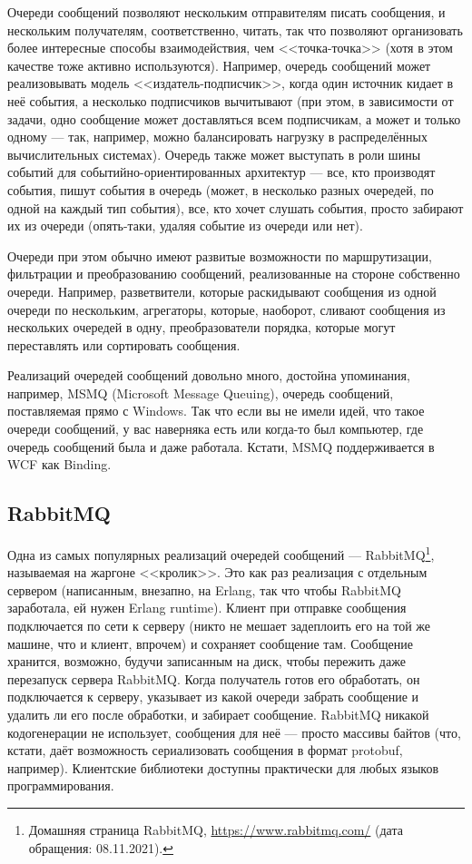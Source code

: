 \documentclass[a5paper]{article}
\begin{document}
Очереди сообщений позволяют нескольким отправителям писать сообщения, и нескольким получателям, соответственно, читать, так что позволяют организовать более интересные способы взаимодействия, чем <<точка-точка>> (хотя в этом качестве тоже активно используются). Например, очередь сообщений может реализовывать модель <<издатель-подписчик>>, когда один источник кидает в неё события, а несколько подписчиков вычитывают (при этом, в зависимости от задачи, одно сообщение может доставляться всем подписчикам, а может и только одному --- так, например, можно балансировать нагрузку в распределённых вычислительных системах). Очередь также может выступать в роли шины событий для событийно-ориентированных архитектур --- все, кто производят события, пишут события в очередь (может, в несколько разных очередей, по одной на каждый тип события), все, кто хочет слушать события, просто забирают их из очереди (опять-таки, удаляя событие из очереди или нет).

Очереди при этом обычно имеют развитые возможности по маршрутизации, фильтрации и преобразованию сообщений, реализованные на стороне собственно очереди. Например, разветвители, которые раскидывают сообщения из одной очереди по нескольким, агрегаторы, которые, наоборот, сливают сообщения из нескольких очередей в одну, преобразователи порядка, которые могут переставлять или сортировать сообщения.

Реализаций очередей сообщений довольно много, достойна упоминания, например, MSMQ (Microsoft Message Queuing), очередь сообщений, поставляемая прямо с Windows. Так что если вы не имели идей, что такое очереди сообщений, у вас наверняка есть или когда-то был компьютер, где очередь сообщений была и даже работала. Кстати, MSMQ поддерживается в WCF как Binding.

\subsection{RabbitMQ}

Одна из самых популярных реализаций очередей сообщений --- RabbitMQ\footnote{Домашняя страница RabbitMQ, \url{https://www.rabbitmq.com/} (дата обращения: 08.11.2021).}, называемая на жаргоне <<кролик>>. Это как раз реализация с отдельным сервером (написанным, внезапно, на Erlang, так что чтобы RabbitMQ заработала, ей нужен Erlang runtime). Клиент при отправке сообщения подключается по сети к серверу (никто не мешает задеплоить его на той же машине, что и клиент, впрочем) и сохраняет сообщение там. Сообщение хранится, возможно, будучи записанным на диск, чтобы пережить даже перезапуск сервера RabbitMQ. Когда получатель готов его обработать, он подключается к серверу, указывает из какой очереди забрать сообщение и удалить ли его после обработки, и забирает сообщение. RabbitMQ никакой кодогенерации не использует, сообщения для неё --- просто массивы байтов (что, кстати, даёт возможность сериализовать сообщения в формат protobuf, например). Клиентские библиотеки доступны практически для любых языков программирования.
\end{document}
